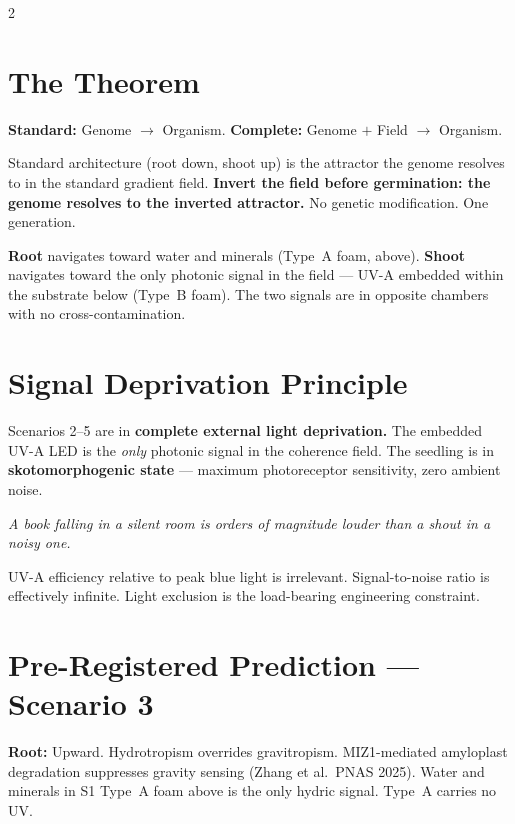 \documentclass[8pt, a4paper]{article}
\begin{document}
\begin{multicols}{2}


\section{The Theorem}
{\small
\textbf{Standard:} Genome $\rightarrow$ Organism.\quad
\textbf{Complete:} Genome $+$ Field $\rightarrow$ Organism.

Standard architecture (root down, shoot up) is the attractor
the genome resolves to in the standard gradient field.
\textbf{Invert the field before germination: the genome resolves
to the inverted attractor.} No genetic modification. One generation.

\smallskip\noindent
\textbf{Root} navigates toward water and minerals (Type~A foam, above).
\textbf{Shoot} navigates toward the only photonic signal in the
field --- UV-A embedded within the substrate below (Type~B foam).
The two signals are in opposite chambers with no cross-contamination.
}

\section{Signal Deprivation Principle}
{\small
Scenarios 2--5 are in \textbf{complete external light deprivation.}
The embedded UV-A LED is the \textit{only} photonic signal in the
coherence field. The seedling is in \textbf{skotomorphogenic state}
--- maximum photoreceptor sensitivity, zero ambient noise.

\textit{A book falling in a silent room is orders of magnitude
louder than a shout in a noisy one.}

UV-A efficiency relative to peak blue light is irrelevant.
Signal-to-noise ratio is effectively infinite.
Light exclusion is the load-bearing engineering constraint.
}

\section{Pre-Registered Prediction --- Scenario 3}
{\small
\textbf{Root:} Upward. Hydrotropism overrides gravitropism.
MIZ1-mediated amyloplast degradation suppresses gravity sensing
(Zhang et al.\ PNAS 2025). Water and minerals in S1 Type~A foam
above is the only hydric signal. Type~A carries no UV.

}
\end{multicols}
\end{document}
